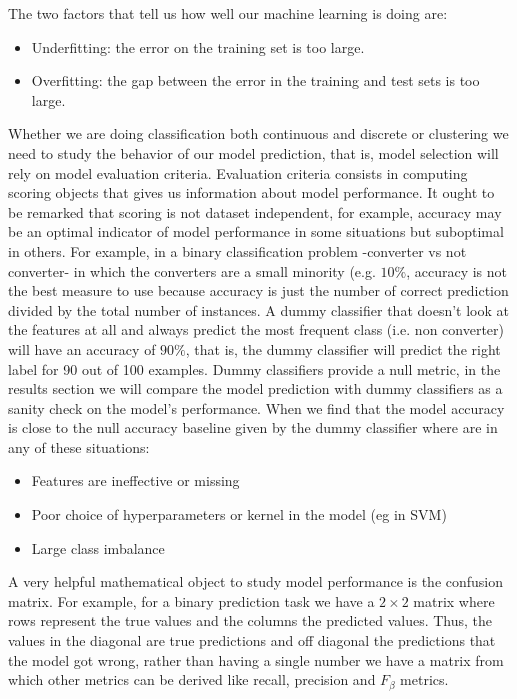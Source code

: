 \documentclass[11pt]{article}
\theoremstyle{definition}
\theoremstyle{remark}
\begin{document}
{The two factors that tell us how well our machine learning is doing are:
\begin{itemize}
\item Underfitting: the error on the training set is too large.
\item Overfitting: the gap between the error in the training and test sets is too large. 
\end{itemize}

Whether we are doing classification both continuous and discrete or clustering we need to study the behavior of our model prediction, that is, model selection will rely on model evaluation criteria. Evaluation criteria consists in computing scoring objects that gives us information about model performance. It ought to be remarked that scoring is not dataset independent, for example, accuracy may be an optimal indicator of model performance in some situations but suboptimal in others. For example, in a binary classification problem -converter vs not converter- in which the converters are a small minority (e.g. $10\%$, accuracy is not the best measure to use because accuracy is just the number of correct prediction divided by the total number of instances. A dummy classifier that doesn't look at the features at all and always predict the most frequent class (i.e. non converter) will have an accuracy of $90\%$, that is, the dummy classifier will predict the right label for 90 out of 100 examples.
Dummy classifiers provide a null metric, in the results section we will compare the model prediction with dummy classifiers as a sanity check on the model's performance.
When we find that the model accuracy is close to the null accuracy baseline given by the dummy classifier where are in any of these situations:
\begin{itemize}
	\item Features are ineffective or missing
	\item Poor choice of hyperparameters or kernel in the model (eg in SVM) 
	\item Large class imbalance 
\end{itemize}
 A very helpful mathematical object to study model performance is the confusion matrix. For example, for a binary prediction task we have a $2 \times 2$ matrix where rows represent the true values and the columns the predicted values. Thus, the values in the diagonal are true predictions and off diagonal the predictions that the model got wrong, rather  than having a single number we have a matrix from which other metrics can be derived like recall, precision and $F_\beta$ metrics.
}
\end{document}
